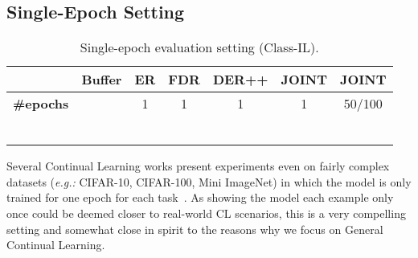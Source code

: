 \documentclass{article}
\begin{document}
\subsection{Single-Epoch Setting}
\label{subsec:single_ep}

\begin{table}[H]
    
    \centering
    \begin{tabular}{ccccccc}
    \toprule
& Buffer & ER & FDR & DER++ & JOINT & JOINT\\ \midrule
    \textbf{\#epochs} & & 1 & 1 & 1 & 1 & 50/100\\ \midrule
     &   &  &  &  & & \\ &   &  &  &  &  &  \\ &  &  &  &  & & \\ \midrule
     &    &  &  &   & & \\ &    &  &  &   &  &  \\ &  &  &  &  & & \\ \bottomrule
    \end{tabular}
    \vspace{0.5em}
    \caption{Single-epoch evaluation setting (Class-IL).}
    \label{tab:singleepoch}
\end{table}

Several Continual Learning works present experiments even on fairly complex datasets (\textit{e.g.:} CIFAR-10, CIFAR-100, Mini ImageNet) in which the model is only trained for one epoch for each task~\cite{aljundi2019gradient, chaudhry2020using, chaudhry2018efficient, lopez2017gradient}. As showing the model each example only once could be deemed closer to real-world CL scenarios, this is a very compelling setting and somewhat close in spirit to the reasons why we focus on General Continual Learning.
\end{document}
